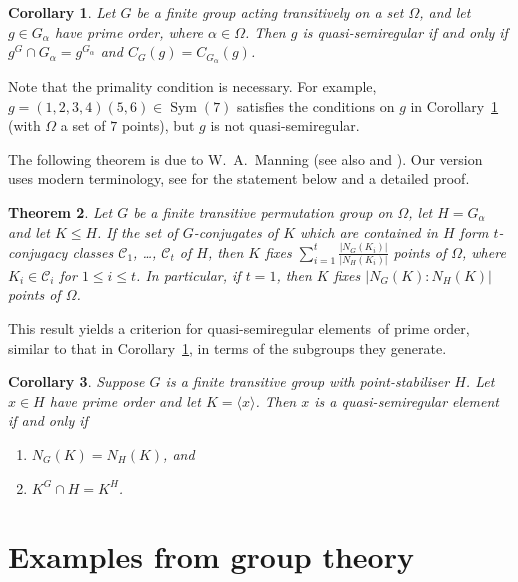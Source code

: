 \documentclass{article}
\newtheorem{thm}{Theorem}[section]
\newtheorem{cor}[thm]{Corollary}
\theoremstyle{remark}
\theoremstyle{definition}
\DeclareMathOperator{\Sym}{Sym}
\newcommand{\qsr}{quasi-semiregular}
\newcommand{\qsre}{quasi-semiregular element}
\newcommand{\qsres}{quasi-semiregular elements}
\newcommand{\la}{\langle}
\newcommand{\ra}{\rangle}
\begin{document}
\begin{cor}
\label{cor: qsr iff cent condition}
    Let $G$ be a  finite group acting transitively on a set $\Omega$, and let $g\in G_\alpha$ {  have prime order}, where $\alpha \in \Omega$. Then $g$ is {\qsr} if and only if $g^G \cap G_\alpha = g^{G_\alpha}$ and $C_G(g) = C_{G_\alpha}(g)$.
\end{cor}

{  Note that the primality condition is necessary. For example, $g=(1,2,3,4)(5,6)\in \Sym(7)$ satisfies the conditions on $g$ in Corollary~\ref{cor: qsr iff cent condition} (with $\Omega$ a set of $7$ points), but $g$ is not {\qsr}.}

The following theorem is due to W.~A.~Manning \cite[Theorem XIV]{Manning} (see also \cite[Lemma 2.1]{CherylOnManning} and  \cite[Theorem]{AlperinOnManning}). Our version uses modern terminology,   see \cite[Lemma 2.23]{PraegerSchneider}  for the statement below and a detailed proof. 

\begin{thm}
    Let $G$ be a finite transitive permutation group on $\Omega$, let $H=G_\alpha$ and let $K\leqslant H$. If the set of $G$-conjugates of $K$ which are contained in $H$ form $t$-conjugacy classes $\mathcal C_1$, \ldots, $\mathcal C_t$ of $H$, then $K$ fixes $\sum_{i=1}^t\frac{|N_G(K_i)|}{|N_H(K_i)|}$ points of $\Omega$, where $K_i \in \mathcal C_i$ for $1\leqslant i \leqslant t$. In particular, if $t=1$, then $K$ fixes $|N_G(K):N_H(K)|$ points of $\Omega$.
\end{thm}

{   This result yields a  criterion for \qsres\ of prime order, similar to that in Corollary~\ref{cor: qsr iff cent condition}, in terms of the subgroups they generate.}

\begin{cor}
\label{cor: normalisers equals implies qsr}
  Suppose $G$ is a finite transitive group with point-stabiliser $H$. Let $x\in H$ have prime order and let $K=\la x \ra$. 
Then $x$ is a {\qsre} if and only if 
\begin{enumerate}
    \item[(1)] $N_G(K) = N_H(K)$, and 
    \item[(2)] $K^G \cap H = K^H$. 
    \end{enumerate}
\end{cor}





\section{Examples from group theory}
\label{sec:egs-gp theory}
\end{document}
